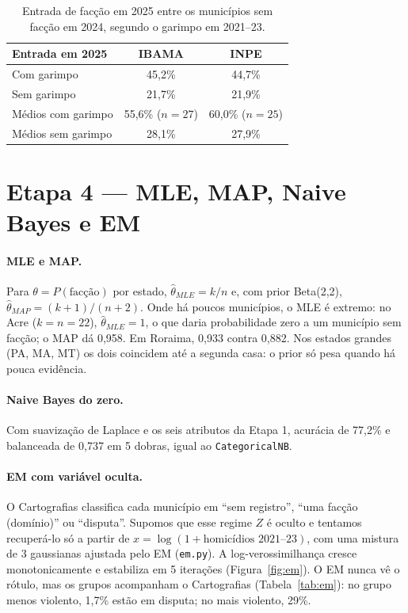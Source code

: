 \documentclass[10pt,a4paper,twocolumn]{article}
\begin{document}
\begin{table}[t]
\centering\small
\begin{tabular}{@{}lcc@{}}
\toprule
Entrada em 2025 & IBAMA & INPE\\
\midrule
Com garimpo & 45,2\% & 44,7\%\\
Sem garimpo & 21,7\% & 21,9\%\\
Médios com garimpo & 55,6\% ($n=27$) & 60,0\% ($n=25$)\\
Médios sem garimpo & 28,1\% & 27,9\%\\
\bottomrule
\end{tabular}
\caption{Entrada de facção em 2025 entre os municípios sem facção em 2024, segundo o
garimpo em 2021--23.}\label{tab:garimpo}
\end{table}

\section{Etapa 4 --- MLE, MAP, Naive Bayes e EM}

\paragraph{MLE e MAP.} Para $\theta=P(\text{facção})$ por estado, $\hat\theta_{MLE}=k/n$ e,
com prior Beta(2,2), $\hat\theta_{MAP}=(k+1)/(n+2)$. Onde há poucos municípios, o MLE é
extremo: no Acre ($k=n=22$), $\hat\theta_{MLE}=1$, o que daria probabilidade zero a um
município sem facção; o MAP dá 0,958. Em Roraima, 0,933 contra 0,882. Nos estados grandes
(PA, MA, MT) os dois coincidem até a segunda casa: o prior só pesa quando há pouca
evidência.

\paragraph{Naive Bayes do zero.} Com suavização de Laplace e os seis atributos da Etapa 1,
acurácia de 77,2\% e balanceada de 0,737 em 5 dobras, igual ao \texttt{CategoricalNB}.

\paragraph{EM com variável oculta.} O Cartografias classifica cada município em ``sem
registro'', ``uma facção (domínio)'' ou ``disputa''. Supomos que esse regime $Z$ é oculto e
tentamos recuperá-lo só a partir de $x=\log(1+\text{homicídios 2021--23})$, com uma mistura
de 3 gaussianas ajustada pelo EM (\texttt{em.py}). A log-verossimilhança cresce
monotonicamente e estabiliza em 5 iterações (Figura~\ref{fig:em}). O EM nunca vê o rótulo,
mas os grupos acompanham o Cartografias (Tabela~\ref{tab:em}): no grupo menos violento,
1,7\% estão em disputa; no mais violento, 29\%.
\end{document}
